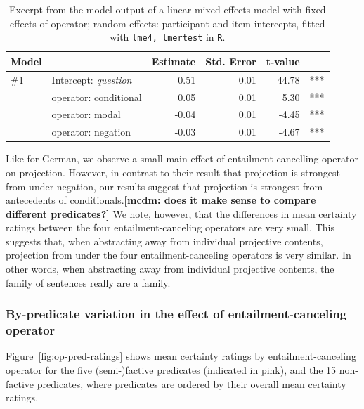 \documentclass[a4paper,12pt,twoside]{article}
\newcommand{\mcdm}[1]{\textbf{\color{blue}[mcdm: #1]}}
\begin{document}
			\begin{table}[ht]
					\centering
					\hspace{-1.3em}
					\begin{tabular}{llrrrr}
						Model & & Estimate & Std. Error & t-value\\
						\midrule
						\#1 & Intercept: \emph{question} & 0.51 & 0.01 & 44.78 & ***\\
						& operator: conditional & 0.05 & 0.01 & 5.30 & ***\\
						& operator: modal & -0.04 & 0.01 & -4.45 & ***\\
						& operator: negation & -0.03 & 0.01 & -4.67 & ***\\
						\bottomrule
					\end{tabular}
				
					\caption{Excerpt from the model output of a linear mixed effects model with fixed effects of operator; random effects: participant and item intercepts, fitted with \texttt{lme4, lmertest} in \texttt{R}.\label{t:op-model}}
				\end{table}

			Like \citet{sieker_projective_2022} for German, we observe a small main effect of entailment-cancelling operator on projection. However, in contrast to their result that projection is strongest from under negation, our results suggest that projection is strongest from antecedents of conditionals.\mcdm{does it make sense to compare different predicates?}
            We note, however, that the differences in mean certainty ratings between the four entailment-canceling operators are very small. This suggests that, when abstracting away from individual projective contents, projection from under the four entailment-canceling operators is very similar. In other words, when abstracting away from individual projective contents, the family of sentences really are a family.


		\subsubsection{By-predicate variation in the effect of entailment-canceling operator}\label{s:by-pred}

    Figure~\ref{fig:op-pred-ratings} shows mean certainty ratings by entailment-canceling operator for the five (semi-)factive predicates (indicated in pink), and the 15 non-factive predicates, where predicates are ordered by their overall mean certainty ratings.
\end{document}
